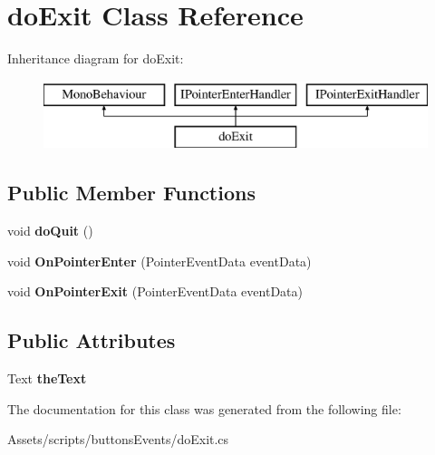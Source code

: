 \hypertarget{classdo_exit}{}\section{do\+Exit Class Reference}
\label{classdo_exit}
Inheritance diagram for do\+Exit\+:\begin{figure}[H]
\begin{center}
\leavevmode
\includegraphics[height=2.000000cm]{classdo_exit}
\end{center}
\end{figure}
\subsection*{Public Member Functions}
\begin{DoxyCompactItemize}
\item 
\mbox{\label{classdo_exit_a359569d05bd0a7182cf0715be4f9fece}} 
void {\bfseries do\+Quit} ()
\item 
\mbox{\label{classdo_exit_ab09be60203d8a4919ef31d54726fb2bf}} 
void {\bfseries On\+Pointer\+Enter} (Pointer\+Event\+Data event\+Data)
\item 
\mbox{\label{classdo_exit_a81fe3192874bae06d0bcb2848c15d042}} 
void {\bfseries On\+Pointer\+Exit} (Pointer\+Event\+Data event\+Data)
\end{DoxyCompactItemize}
\subsection*{Public Attributes}
\begin{DoxyCompactItemize}
\item 
\mbox{\label{classdo_exit_af4fddfa76423a0eb4e4d64a6d3a782e8}} 
Text {\bfseries the\+Text}
\end{DoxyCompactItemize}


The documentation for this class was generated from the following file\+:\begin{DoxyCompactItemize}
\item 
Assets/scripts/buttons\+Events/do\+Exit.\+cs\end{DoxyCompactItemize}
